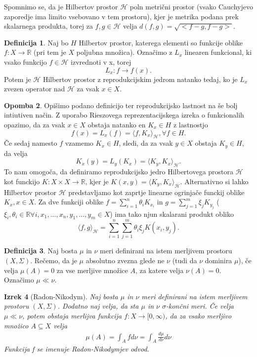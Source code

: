 \documentclass[12pt,a4paper]{amsart}
\theoremstyle{definition} %
\newtheorem{definicija}{Definicija}[section]
\newtheorem{opomba}[definicija]{Opomba}
\theoremstyle{plain} %
\newtheorem{izrek}[definicija]{Izrek}
\begin{document}
Spomnimo se, da je Hilbertov prostor $\mathcal{H}$ poln metrični prostor (vsako Cauchyjevo zaporedje ima limito vsebovano v tem prostoru), kjer je metrika podana prek skalarnega produkta, torej za $f,g \in \mathcal{H}$ velja $d(f,g) = \sqrt{<f-g,f-g>}$.
\begin{definicija}
Naj bo $H$ Hilbertov prostor, katerega elementi so funkcije oblike $f: X \rightarrow \mathbb{R}$ (pri tem je $X$ poljubna množica). Označimo z $L_x$ linearen funkcional, ki vsako funkcijo $f \in \mathcal{H}$ izvrednoti v x, torej $$L_x : f \rightarrow f(x).$$ Potem je $\mathcal{H}$ Hilbertov prostor z reprodukcijskim jedrom natanko tedaj, ko je $L_x$ zvezen operator nad $\mathcal{H}$ za vsak $x \in X$. 
\end{definicija}
\begin{opomba}
Opišimo podano definicijo ter reprodukcijsko lastnost na še bolj intiutiven način. Z uporabo Rieszovega reprezentacijskega izreka o funkcionalih opazimo, da za vsak $x \in X$ obstaja natanko en $K_x \in H$ z lastnostjo
$$
f(x) = L_x(f) = \langle f, K_x \rangle_{\mathcal{H}}, \forall f \in H.
$$
Če sedaj namesto $f$ vzamemo $K_x \in H$, sledi, da za vsak $y \in X$ obstaja $K_y \in H$, da velja
$$
K_x(y) = L_y(K_x) = \langle K_y, K_x \rangle_{\mathcal{H}}.
$$
To nam omogoča, da definiramo reprodukcijsko jedro Hilbertovega prostora $\mathcal{H}$ kot funckijo $K: X \times X \rightarrow \mathbb{R}$, kjer je $K(x,y)=\langle K_y, K_x \rangle_{\mathcal{H}}.$
\newline
\newline
Alternativno si lahko Hilbertov prostor $\mathcal{H}$ predstavljamo kot zaprtje linearne ogrinjače funckij oblike $K_x, x \in X$. Za dve funkciji oblike $f = \sum_{i=1}^{n}\theta_i K_{x_i}$ in $ g = \sum_{j=1}^{m}\xi_j K_{y_j}$ ($\xi_i, \theta_i \in \mathbb{R} \forall i, x_1,...,x_n,y_1,...,y_m \in X$) ima tako njun skalarani produkt obliko
$$
\langle f, g\rangle_{\mathcal{H}} = \sum_{i=1}^{n}\sum_{j=1}^{m}\theta_i \xi_j K(x_i,y_j).
$$
\end{opomba}
\begin{definicija} 
Naj bosta $\mu$ in $\nu$ meri definirani na istem merljivem prostoru $(X, \Sigma)$. Rečemo, da je $\mu$ absolutno zvezna glede ne $\nu$ (tudi da $\nu$ dominira $\mu$), če velja $\mu(A) = 0$ za vse merljive množice $A$, za katere velja $\nu(A)=0$. Označimo $\mu \ll \nu$.
\end{definicija}

\begin{izrek} [Radon-Nikodym]
Naj bosta $\mu$ in $\nu$ meri definirani na istem merljivem prostoru $(X, \Sigma)$. Dodatno naj velja, da sta $\mu$ in $\nu$ $\sigma$-končni meri. Če velja  $\mu \ll \nu$, potem obstaja merlijva funkcija $f : X \rightarrow [0,\infty)$, da za vsako merljivo množico $A \subseteq X$ velja
\begin{gather*}
\mu(A) = \int_A f d \nu = \int_A \frac{d \mu}{d \nu} d \nu
\end{gather*}
Funkcija f se imenuje Radon-Nikodymjev odvod.
\end{izrek}
\end{document}
